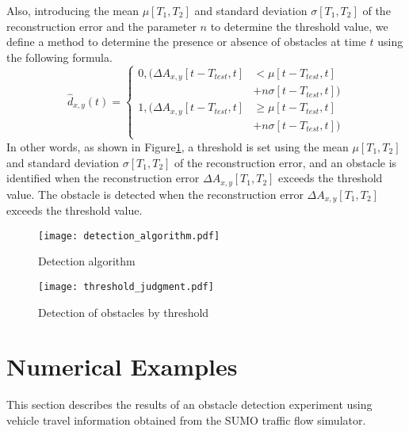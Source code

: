 \documentclass[paper]{ieice}
\begin{document}
%
Also, introducing the mean $\mu[T_1,T_2]$ and standard deviation $\sigma[T_1,T_2]$ of the reconstruction error and the parameter $n$ to determine the threshold value, we define a method to determine the presence or absence of obstacles at time $t$ using the following formula.
%
\begin{equation}
  \hat{d}_{x,y}(t) =
  \begin{cases}
    0, (\Delta{A}_{x,y}[t-T_{test},t] & < \mu[t-T_{test},t]      \\
                                      & + n\sigma[t-T_{test},t]) \\
    1, (\Delta{A}_{x,y}[t-T_{test},t] & \geq \mu[t-T_{test},t]   \\
                                      & + n\sigma[t-T_{test},t]) \\
  \end{cases}
  \label{eq:discrimination}
\end{equation}
%
In other words, as shown in Figure\ref{fig:detection_algorithm}, a threshold is set using the mean $\mu[T_1,T_2]$ and standard deviation $\sigma[T_1,T_2]$ of the reconstruction error, and an obstacle is identified when the reconstruction error $\Delta A_{x,y}[T_1,T_2]$ exceeds the threshold value. The obstacle is detected when the reconstruction error $\Delta A_{x,y}[T_1,T_2]$ exceeds the threshold value.
%
\begin{figure}[tb]
  \centering
  \texttt{[image: detection\_algorithm.pdf]}
  \caption{Detection algorithm}
  \label{fig:detection_algorithm}
\end{figure}
%
\begin{figure}[tb]
  \begin{center}
    \texttt{[image: threshold\_judgment.pdf]}
  \end{center}
  \caption{Detection of obstacles by threshold}
  \label{fig:threshold_judgment}
\end{figure}
%
\section{Numerical Examples}
\label{sec:result}
%
This section describes the results of an obstacle detection experiment using vehicle travel information obtained from the SUMO traffic flow simulator.
%
\end{document}
